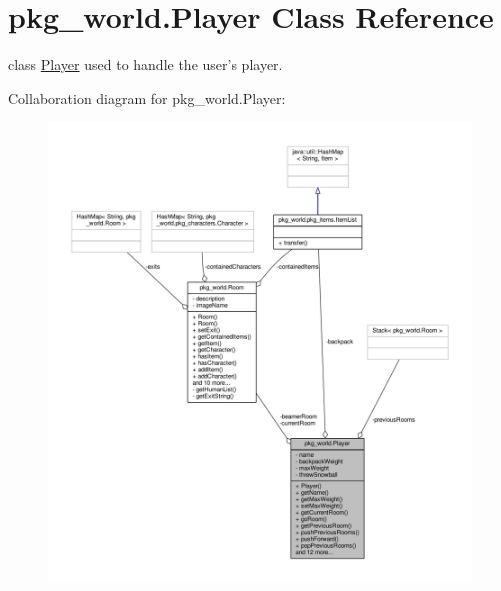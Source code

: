 \hypertarget{classpkg__world_1_1Player}{\section{pkg\-\_\-world.\-Player Class Reference}
\label{classpkg__world_1_1Player}
}


class \hyperlink{classpkg__world_1_1Player}{Player} used to handle the user's player.  




Collaboration diagram for pkg\-\_\-world.\-Player\-:\nopagebreak
\begin{figure}[H]
\begin{center}
\leavevmode
\includegraphics[width=350pt]{classpkg__world_1_1Player__coll__graph}
\end{center}
\end{figure}
